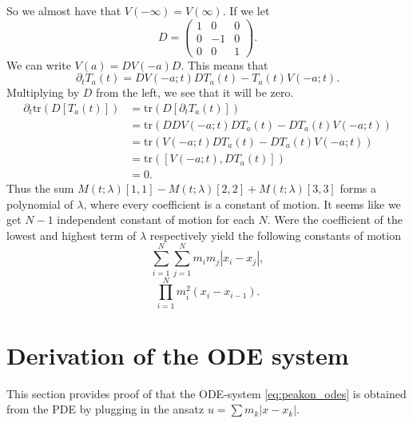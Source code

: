 \documentclass[english,master]{liumaiex}
\theoremstyle{plain}
\theoremstyle{definition}
\newcommand{\tr}{\text{tr}}
\begin{document}
So we almost have that $V(-\infty) = V(\infty)$. If we let
\begin{equation}
	D = 
\begin{pmatrix}
	1 & 0 & 0 \\
	0 & -1 & 0 \\
	0 & 0 & 1
\end{pmatrix}.
\end{equation}
%
We can write $V(a) = DV(-a)D$. This means that 
\begin{equation}
	\partial_t T_a(t) = DV(-a;t)DT_a(t) - T_a(t)V(-a;t).
\end{equation}
Multiplying by $D$ from the left, we see that it will be zero.
\begin{equation}
\begin{aligned}
	\partial_t \tr(D [T_a(t)])
	&= \tr(D [\partial_t T_a(t)]) \\
	&= \tr(DDV(-a;t)DT_a(t) - DT_a(t)V(-a;t)) \\
	&= \tr(V(-a;t)DT_a(t) - DT_a(t)V(-a;t)) \\
	&= \tr([V(-a;t), DT_a(t)]) \\
	&= 0.
\end{aligned}
\end{equation}
Thus the sum $M(t;\lambda)[1,1] - M(t;\lambda)[2,2] + M(t;\lambda)[3,3]$ forms a polynomial of $\lambda$, where every coefficient is a constant of motion. It seems like we get $N-1$ independent constant of motion for each $N$. Were the coefficient of the lowest and highest term of $\lambda$ respectively yield the following constants of motion
\begin{equation}
	\sum_{i=1}^{N}\sum_{j=1}^N m_i m_j |x_i - x_j|,
\end{equation}
\begin{equation}
	\prod_{i=1}^{N} m_i^2 (x_i - x_{i-1}).
\end{equation}

%
%
\newpage
\appendix

\section{Derivation of the ODE system} \label{sec:DerivationODE}

This section provides proof of that the ODE-system \eqref{eq:peakon_odes} is obtained from the PDE by plugging in the ansatz $u = \sum m_k |x - x_k|$.
\end{document}
